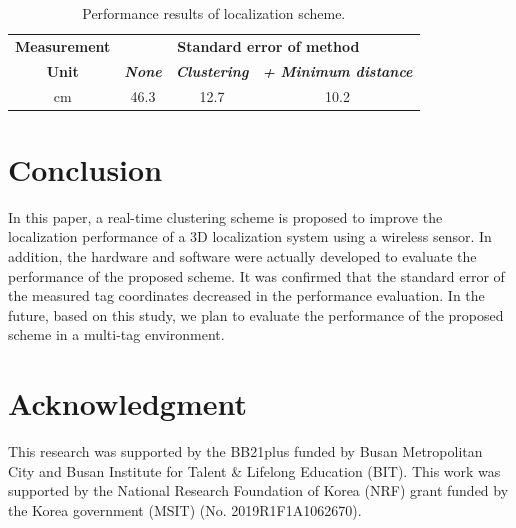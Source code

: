 \documentclass[conference]{IEEEtran}
\begin{document}
\begin{table}[htbp]
    \caption{Performance results of localization scheme.}
    \begin{center}
        \begin{tabular}{|c|c|c|c|}
            \hline
            \textbf{Measurement} & \multicolumn{3}{|c|}{\textbf{Standard error of method}}                                                                       \\
            \cline{2-4}
            \textbf{Unit}        & \textbf{\textit{None}}                                  & \textbf{\textit{Clustering}} & \textbf{\textit{+ Minimum distance}} \\
            \hline
            cm                   & 46.3                                                    & 12.7                         & 10.2                                 \\
            \hline
        \end{tabular}
        \label{tab1}
    \end{center}
\end{table}

\section{Conclusion}

In this paper, a real-time clustering scheme is proposed to improve the localization performance of a 3D localization system using a wireless sensor. In addition, the hardware and software were actually developed to evaluate the performance of the proposed scheme. It was confirmed that the standard error of the measured tag coordinates decreased in the performance evaluation. In the future, based on this study, we plan to evaluate the performance of the proposed scheme in a multi-tag environment.

\section*{Acknowledgment}

This research was supported by the BB21plus funded by Busan Metropolitan City and Busan Institute for Talent \& Lifelong Education (BIT).
This work was supported by the National Research Foundation of Korea (NRF) grant funded by the Korea government (MSIT) (No. 2019R1F1A1062670).
\end{document}
